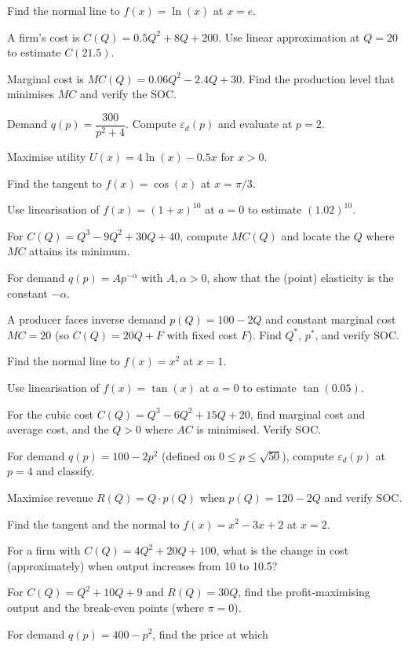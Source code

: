 \begin{problems}
  \item Find the normal line to $f(x)=\ln(x)$ at $x=e$.
  \item A firm's cost is $C(Q)=0.5Q^2+8Q+200$. Use linear approximation at
        $Q=20$ to estimate $C(21.5)$.
  \item Marginal cost is $MC(Q)=0.06Q^2-2.4Q+30$. Find the production level
        that minimises $MC$ and verify the SOC.
  \item Demand $q(p)=\dfrac{300}{p^2+4}$. Compute $\varepsilon_d(p)$ and
        evaluate at $p=2$.
  \item Maximise utility $U(x)=4\ln(x)-0.5x$ for $x>0$.
  \item Find the tangent to $f(x)=\cos(x)$ at $x=\pi/3$.
  \item Use linearisation of $f(x)=(1+x)^{10}$ at $a=0$ to estimate
        $(1.02)^{10}$.
  \item For $C(Q)=Q^3-9Q^2+30Q+40$, compute $MC(Q)$ and locate the $Q$
        where $MC$ attains its minimum.
  \item For demand $q(p)=Ap^{-\alpha}$ with $A,\alpha>0$, show that the
        (point) elasticity is the constant $-\alpha$.
  \item A producer faces inverse demand $p(Q)=100-2Q$ and constant
        marginal cost $MC=20$ (so $C(Q)=20Q+F$ with fixed cost $F$). Find
        $Q^*$, $p^*$, and verify SOC.
  \item Find the normal line to $f(x)=x^2$ at $x=1$.
  \item Use linearisation of $f(x)=\tan(x)$ at $a=0$ to estimate
        $\tan(0.05)$.
  \item For the cubic cost $C(Q)=Q^3-6Q^2+15Q+20$, find marginal cost and
        average cost, and the $Q>0$ where $AC$ is minimised. Verify SOC.
  \item For demand $q(p)=100-2p^2$ (defined on $0\le p\le\sqrt{50}$),
        compute $\varepsilon_d(p)$ at $p=4$ and classify.
  \item Maximise revenue $R(Q)=Q\cdot p(Q)$ when $p(Q)=120-2Q$ and verify
        SOC.
  \item Find the tangent and the normal to $f(x)=x^2-3x+2$ at $x=2$.
  \item For a firm with $C(Q)=4Q^2+20Q+100$, what is the change in cost
        (approximately) when output increases from 10 to 10.5?
  \item For $C(Q)=Q^2+10Q+9$ and $R(Q)=30Q$, find the profit-maximising
        output and the break-even points (where $\pi=0$).
  \item For demand $q(p)=400-p^2$, find the price at which

\end{problems}
